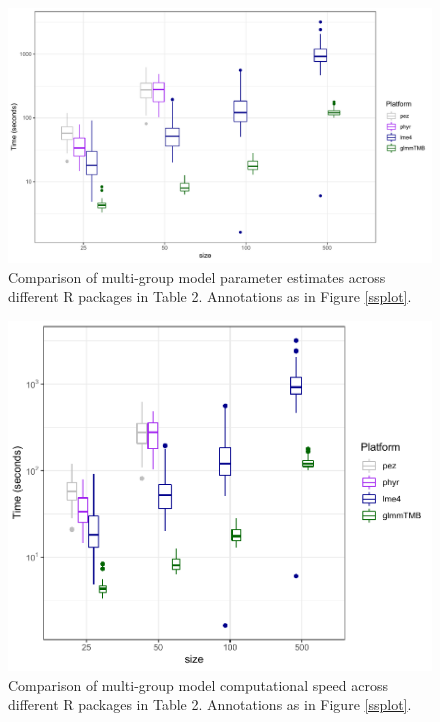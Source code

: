\documentclass[12pt]{article}
\begin{document}
\begin{center}
\begin{figure}[H]
  \includegraphics[scale=0.7,page=1]{./figure/msplot.pdf}
  \caption{Comparison of multi-group model parameter estimates across different R packages in Table 2. Annotations as in Figure \ref{ssplot}.
  }
  \label{msplot}
\end{figure}
\end{center}


\begin{center}
\begin{figure}[H]
  \includegraphics[scale=0.8]{./figure/mstime.pdf}
  \caption{Comparison of multi-group model computational speed across different R packages in Table 2. Annotations as in Figure \ref{ssplot}.}
  \label{msplot_time}
\end{figure}
\end{center}
\end{document}
